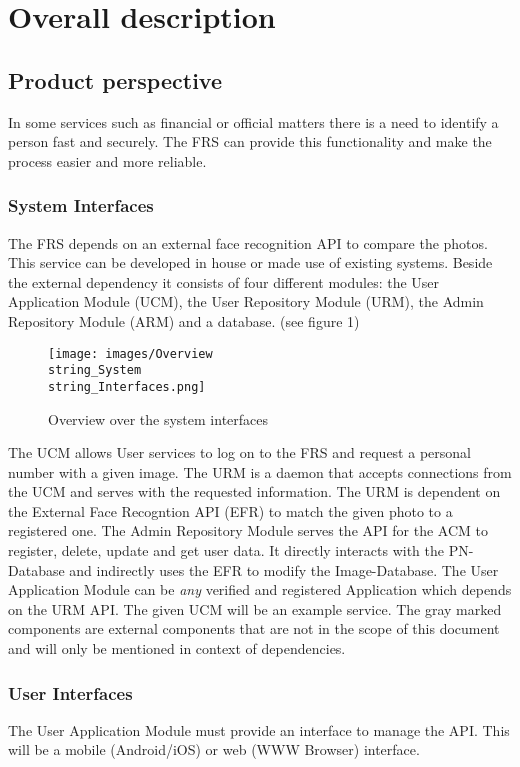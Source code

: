 \documentclass[a4paper,11pt]{article}
\begin{document}
\newpage
\section{Overall description}

\subsection{Product perspective}
In some services such as financial or official matters there is a need to identify a person fast and securely. The FRS can provide this functionality and make the process easier and more reliable.

\subsubsection{System Interfaces}
The FRS depends on an external face recognition API to compare the photos. This service can be developed in house or made use of existing systems. Beside the external dependency it consists of four different modules: the User Application Module (UCM), the User Repository Module (URM), the Admin Repository Module (ARM) and a database. (see figure 1)
\begin{figure}[h!]
	\centering
	\label{System Interfaces}
	\texttt{[image: images/Overview\\string\_System\\string\_Interfaces.png]}
	\caption{Overview over the system interfaces}
\end{figure}
\newpage
\noindent
The UCM allows User services to log on to the FRS and request a personal number with a given image. The URM is a daemon that accepts connections from the UCM and serves with the requested information. The URM is dependent on the External Face Recogntion API (EFR) to match the given photo to a registered one. The Admin Repository Module serves the API for the ACM to register, delete, update and get user data. It directly interacts with the PN-Database and indirectly uses the EFR to modify the Image-Database.
\newline
\noindent
The User Application Module can be \textit{any} verified and registered Application which depends on the URM API. The given UCM will be an example service. The gray marked components are external components that are not in the scope of this document and will only be mentioned in context of dependencies.

\subsubsection{User Interfaces}
The User Application Module must provide an interface to manage the API. This will be a mobile (Android/iOS) or web (WWW Browser) interface.
\end{document}
